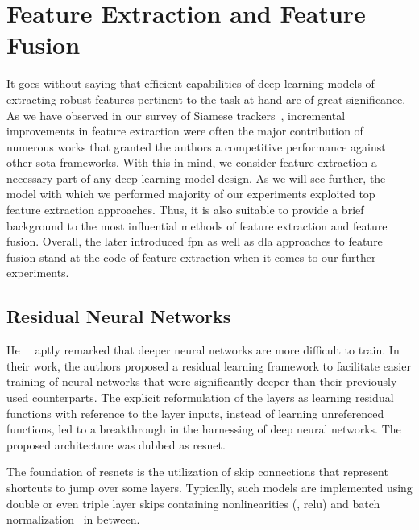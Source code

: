 \section{Feature Extraction and Feature Fusion}
\label{sec:FeatureExtractionFusion}

It goes without saying that efficient capabilities of deep learning models of extracting robust features pertinent to the task at hand are of great significance. As we have observed in our survey of Siamese trackers~\cite{ondrasovic2021siamese}, incremental improvements in feature extraction were often the major contribution of numerous works that granted the authors a competitive performance against other \gls{sota} frameworks. With this in mind, we consider feature extraction a necessary part of any deep learning model design. As we will see further, the model with which we performed majority of our experiments exploited top feature extraction approaches. Thus, it is also suitable to provide a brief background to the most influential methods of feature extraction and feature fusion. Overall, the later introduced \gls{fpn} as well as \gls{dla} approaches to feature fusion stand at the code of feature extraction when it comes to our further experiments.

\subsection{Residual Neural Networks}
\label{ssec:ResidualNeuralNetworks}

He~\etal{}~\cite{he2015resnet} aptly remarked that deeper neural networks are more difficult to train. In their work, the authors proposed a residual learning framework to facilitate easier training of neural networks that were significantly deeper than their previously used counterparts. The explicit reformulation of the layers as learning residual functions with reference to the layer inputs, instead of learning unreferenced functions, led to a breakthrough in the harnessing of deep neural networks. The proposed architecture was dubbed as \gls{resnet}.

The foundation of \glspl{resnet} is the utilization of skip connections that represent shortcuts to jump over some layers. Typically, such models are implemented using double or even triple layer skips containing nonlinearities (\egtext{}, \gls{relu}) and batch normalization~\cite{ioffe2015batchnorm} in between.


